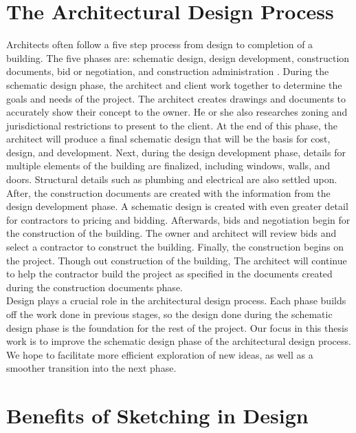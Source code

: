 \section{The Architectural Design Process}

Architects often follow a five step process from design to completion of a building. The five phases are: schematic design, design development, construction documents, bid or negotiation, and construction administration \cite{bestpractices}. During the schematic design phase, the architect and client work together to determine the goals and needs of the project. The architect creates drawings and documents to accurately show their concept to the owner. He or she also researches zoning and jurisdictional restrictions to present to the client. At the end of this phase, the architect will produce a final schematic design that will be the basis for cost, design, and development. Next, during the design development phase, details for multiple elements of the building are finalized, including windows, walls, and doors. Structural details such as plumbing and electrical are also settled upon. After, the construction documents are created with the information from the design development phase. A schematic design is created with even greater detail for contractors to pricing and bidding. Afterwards, bids and negotiation begin for the construction of the building. The owner and architect will review bids and select a contractor to construct the building. Finally, the construction begins on the project. Though out construction of the building, The architect will continue to help the contractor build the project as specified in the documents created during the construction documents phase. \\


Design plays a crucial role in the architectural design process. Each phase builds off the work done in previous stages, so the design done during the schematic design phase is the foundation for the rest of the project. Our focus in this thesis work is to improve the schematic design phase of the architectural design process. We hope to facilitate more efficient exploration of new ideas, as well as a smoother transition into the next phase.

\section{Benefits of Sketching in Design}

